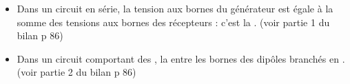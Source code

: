 \begin{mybilan}
	
	\begin{itemize}

		\item Dans un circuit en série, la tension aux bornes du générateur est égale à la somme des tensions aux bornes des récepteurs : c'est la . (voir partie 1 du bilan p 86)\pause
			
			
		\item Dans un circuit comportant des , la  entre les bornes des dipôles branchés en .(voir partie 2 du bilan p 86)
		
		
		
	\end{itemize}
\end{mybilan}